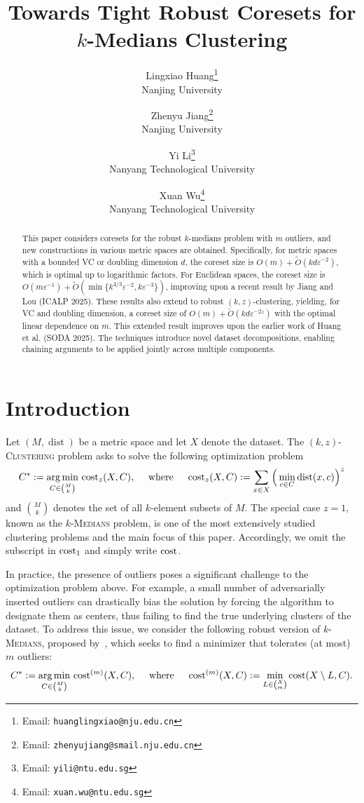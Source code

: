 \documentclass[11pt,letterpaper]{article}
\title{Towards Tight Robust Coresets for $k$-Medians Clustering}
\author{Lingxiao Huang\thanks{
		Email: \texttt{huanglingxiao@nju.edu.cn}
	}\\
	Nanjing University
	\and
	Zhenyu Jiang\thanks{
		Email: \texttt{zhenyujiang@smail.nju.edu.cn}
	}\\
	Nanjing University
	\and
	Yi Li\thanks{ 
		Email: \texttt{yili@ntu.edu.sg}}\\
	Nanyang Technological University
	\and
	Xuan Wu\thanks{ 
		Email: \texttt{xuan.wu@ntu.edu.sg}}\\
	Nanyang Technological University
}
\date{}
\theoremstyle{definition}
\newcommand{\ProblemName}[1]{\textsc{#1}}
\newcommand{\kzC}{\ProblemName{$(k, z)$-Clustering}\xspace}
\newcommand{\kMedian}{\ProblemName{$k$-Medians}\xspace}
\DeclareMathOperator{\dist}{dist}
\DeclareMathOperator*{\argmin}{arg\,min}
\begin{document}

\maketitle

\begin{abstract}
This paper considers coresets for the robust $k$-medians problem with $m$ outliers, and new constructions in various metric spaces are obtained.
Specifically, for metric spaces with a bounded VC or doubling dimension $d$, the coreset size is $O(m) + \tilde{O}(kd\varepsilon^{-2})$, which is optimal up to logarithmic factors. For Euclidean spaces, the coreset size is $O(m\varepsilon^{-1}) + \tilde{O}(\min\{k^{4/3}\varepsilon^{-2}, k\varepsilon^{-3}\})$, improving upon a recent result by Jiang and Lou (ICALP 2025). These results also extend to robust $(k,z)$-clustering, yielding, for VC and doubling dimension, a coreset size of $O(m) + \tilde{O}(kd\varepsilon^{-2z})$ with the optimal linear dependence on $m$. This extended result improves upon the earlier work of Huang et al. (SODA 2025). The techniques introduce novel dataset decompositions, enabling chaining arguments to be applied jointly across multiple components.
\end{abstract}

\tableofcontents

\newpage


\section{Introduction}
Let $(M,\dist)$ be a metric space and let $X$ denote the dataset. 
The \kzC problem asks to solve the following optimization problem 
\[
	C^\ast := \argmin_{C\in \binom{M}{k}} \, \cost_z(X,C), \quad\text{ where }\quad  
    \cost_z(X,C) := \sum_{x\in X} \Big(\min_{c\in C}\dist(x,c)\Big)^z
\]
and $\binom{M}{k}$ denotes the set of all $k$-element subsets of $M$. The special case $z=1$, known as the \kMedian problem, is one of the most extensively studied clustering problems and the main focus of this paper. Accordingly, we omit the subscript in $\cost_1$ and simply write $\cost$.

In practice, the presence of outliers poses a significant challenge to the optimization problem above. For example, a small number of adversarially inserted outliers can drastically bias the solution by forcing the algorithm to designate them as centers, thus failing to find the true underlying clusters of the dataset. To address this issue, we consider the following robust version of \kMedian, proposed by~\cite{charikar2001algorithms}, which seeks to find a minimizer that tolerates (at most) $m$ outliers:
\begin{equation}\label{eqn:robust_cost_intro}
	C^\ast := \argmin_{C\in \binom{M}{k}} \, \cost^{(m)}(X,C), \quad\text{ where }\quad 
	\cost^{(m)}(X,C):=\min_{L\in \binom{X}{m}}\cost(X\setminus L,C).
\end{equation}
\end{document}
